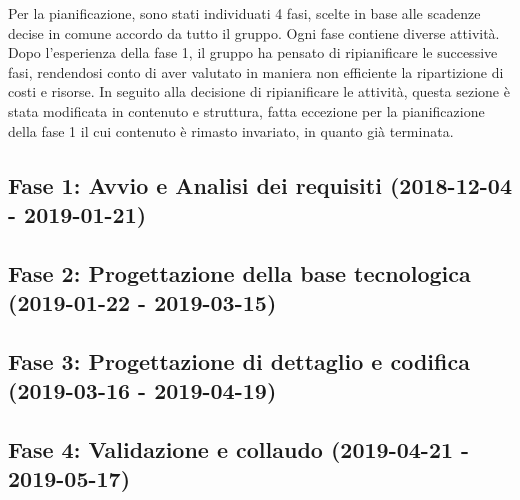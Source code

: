 Per la pianificazione, sono stati individuati 4 fasi, scelte in base alle scadenze decise in comune accordo da tutto il gruppo. Ogni fase contiene diverse attività.\\

\noindent Dopo l'esperienza della fase 1, il gruppo ha pensato di ripianificare le successive fasi, rendendosi conto di aver valutato in maniera non efficiente la ripartizione di costi e risorse. In seguito alla decisione di ripianificare le attività, questa sezione è stata modificata in contenuto e struttura, fatta eccezione per la pianificazione della fase 1 il cui contenuto è rimasto invariato, in quanto già terminata. 
\subsection{Fase 1: Avvio e Analisi dei requisiti (2018-12-04 - 2019-01-21)}
	

\subsection{Fase 2: Progettazione della base tecnologica (2019-01-22 - 2019-03-15)}	
	
	
\subsection{Fase 3: Progettazione di dettaglio e codifica (2019-03-16 - 2019-04-19)}
	
	
\subsection{Fase 4: Validazione e collaudo (2019-04-21 - 2019-05-17)}
	
	
\newpage